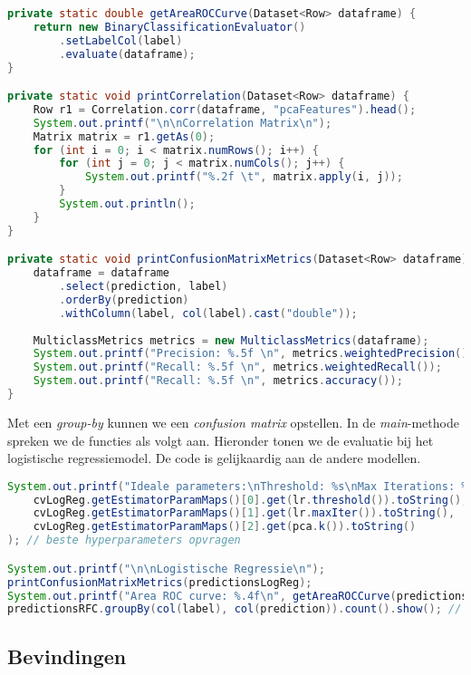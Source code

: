 \documentclass[a4paper,10pt,twoside]{report}
\begin{document}
\begin{lstlisting}[language=Java]
	private static double getAreaROCCurve(Dataset<Row> dataframe) {
	return new BinaryClassificationEvaluator()
		.setLabelCol(label)
		.evaluate(dataframe);
}

private static void printCorrelation(Dataset<Row> dataframe) {
	Row r1 = Correlation.corr(dataframe, "pcaFeatures").head();
	System.out.printf("\n\nCorrelation Matrix\n");
	Matrix matrix = r1.getAs(0);
	for (int i = 0; i < matrix.numRows(); i++) {
		for (int j = 0; j < matrix.numCols(); j++) {
			System.out.printf("%.2f \t", matrix.apply(i, j));
		}
		System.out.println();
	}
}

private static void printConfusionMatrixMetrics(Dataset<Row> dataframe) {
	dataframe = dataframe
		.select(prediction, label)
		.orderBy(prediction)
		.withColumn(label, col(label).cast("double"));
	
	MulticlassMetrics metrics = new MulticlassMetrics(dataframe);
	System.out.printf("Precision: %.5f \n", metrics.weightedPrecision());
	System.out.printf("Recall: %.5f \n", metrics.weightedRecall());
	System.out.printf("Recall: %.5f \n", metrics.accuracy());
}
\end{lstlisting}

Met een \textit{group-by} kunnen we een \textit{confusion matrix} opstellen. In de \textit{main}-methode spreken we de functies als volgt aan. Hieronder tonen we de evaluatie bij het logistische regressiemodel. De code is gelijkaardig aan de andere modellen.

\begin{lstlisting}[language=Java]
System.out.printf("Ideale parameters:\nThreshold: %s\nMax Iterations: %s\nk: %s", 	
	cvLogReg.getEstimatorParamMaps()[0].get(lr.threshold()).toString(),
	cvLogReg.getEstimatorParamMaps()[1].get(lr.maxIter()).toString(),
	cvLogReg.getEstimatorParamMaps()[2].get(pca.k()).toString()
); // beste hyperparameters opvragen

System.out.printf("\n\nLogistische Regressie\n");
printConfusionMatrixMetrics(predictionsLogReg);
System.out.printf("Area ROC curve: %.4f\n", getAreaROCCurve(predictionsLogReg));
predictionsRFC.groupBy(col(label), col(prediction)).count().show(); // confusion matrix
\end{lstlisting}

\subsection*{Bevindingen}
\end{document}
